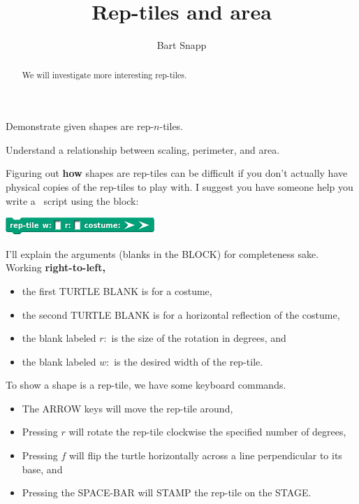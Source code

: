 \documentclass[nooutcomes,noauthor]{ximera}
\title{Rep-tiles and area}
\author{Bart Snapp}
\begin{document}
\begin{abstract}
  We will investigate more interesting rep-tiles.
\end{abstract}
\maketitle


\begin{listOutcomes}
\item Demonstrate given shapes are rep-$n$-tiles.
\item Understand a relationship between scaling, perimeter, and area.
\end{listOutcomes}



Figuring out \textbf{how} shapes are rep-tiles can be difficult if
you don't actually have physical copies of the rep-tiles to play with.
I suggest you have someone help you write a \snap\ script using the block:
\begin{center}
  \includegraphics{BLOCKreptile.png}
\end{center}
I'll explain the arguments (blanks in the BLOCK) for completeness sake.
Working \textbf{right-to-left,}
\begin{itemize}
\item the first TURTLE BLANK is for a costume,
\item the second TURTLE BLANK is for a horizontal reflection of the
  costume,
\item the blank labeled $r:$ is the size of the rotation in degrees, and
\item the blank labeled $w:$ is the desired width of the rep-tile.
\end{itemize}
To show a shape is a rep-tile, we have some keyboard commands.
\begin{itemize}
\item The ARROW keys will move the rep-tile around,
\item Pressing $r$ will rotate the rep-tile clockwise the specified
  number of degrees,
\item Pressing $f$ will flip the turtle horizontally across a line
  perpendicular to its base, and 
\item Pressing the SPACE-BAR will STAMP the rep-tile on the STAGE.
\end{itemize}


\mynewpage
\end{document}
